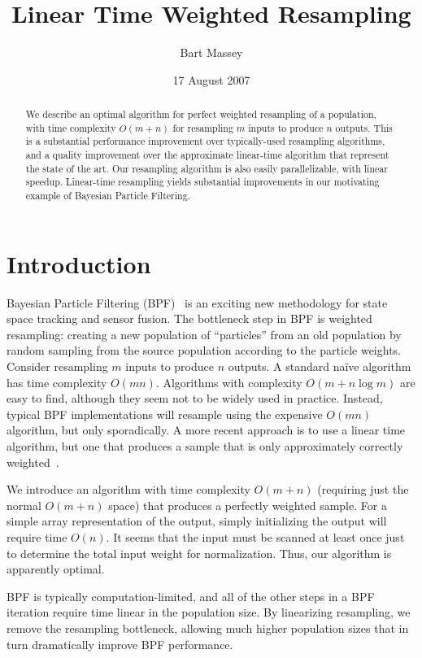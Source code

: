 \documentclass[12pt]{article}
\title{Linear Time Weighted Resampling}
\author{Bart Massey}
\date{17 August 2007}
\begin{document}
  \maketitle

  \begin{abstract}
  We describe an optimal algorithm for perfect weighted resampling
  of a population, with time complexity $O(m + n)$ for
  resampling $m$ inputs to produce $n$ outputs.  This
  is a substantial performance improvement over
  typically-used resampling algorithms, and a quality
  improvement over the
  approximate linear-time algorithm that represent the
  state of the art.  Our resampling algorithm is also easily
  parallelizable, with linear speedup.
  Linear-time resampling yields
  substantial improvements in our motivating example of
  Bayesian Particle Filtering.
  \end{abstract}

\section{Introduction}

  Bayesian Particle Filtering (BPF)~\cite{?} is an exciting new methodology
  for state space tracking and sensor fusion.  The bottleneck
  step in BPF is weighted resampling: creating a new
  population of ``particles'' from an old population by
  random sampling from the source population according to
  the particle weights.    Consider resampling $m$ inputs to
  produce $n$ outputs.  A standard na\"ive algorithm has time complexity
  $O(mn)$. Algorithms with complexity $O(m + n \log m)$ are easy
  to find, although they seem not to be widely used in
  practice.  Instead, typical BPF implementations will resample
  using the expensive $O(mn)$ algorithm, but only
  sporadically.  A more recent approach is to use a linear
  time algorithm, but one that produces a sample that is
  only approximately correctly weighted~\cite{?}.

  We introduce an algorithm with time complexity $O(m + n)$
  (requiring just the normal $O(m + n)$ space) that produces
  a perfectly weighted sample. For a simple array
  representation of the output, simply initializing the
  output will require time $O(n)$.  It seems that the input
  must be scanned at least once just to determine the total
  input weight for normalization.  Thus, our algorithm is
  apparently optimal.

  BPF is typically computation-limited, and all of the other
  steps in a BPF iteration require time linear in the
  population size.  By linearizing resampling, we remove the
  resampling bottleneck, allowing much higher population
  sizes that in turn dramatically improve BPF performance.
\end{document}
